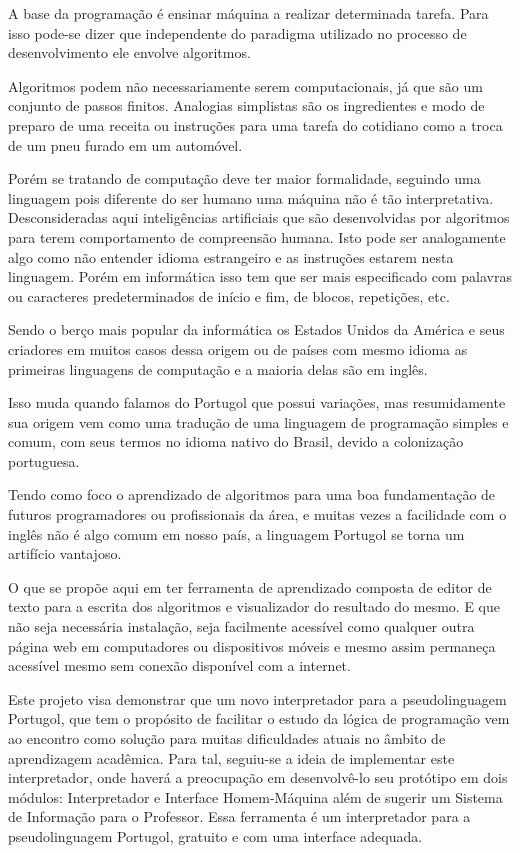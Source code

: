 
A base da programação é ensinar máquina a realizar determinada tarefa. Para isso
pode-se dizer que independente do paradigma utilizado no processo de
desenvolvimento ele envolve algoritmos.

Algoritmos podem não necessariamente serem computacionais, já que são um
conjunto de passos finitos. Analogias simplistas são os ingredientes e modo de
preparo de uma receita ou instruções para uma tarefa do cotidiano como a troca
de um pneu furado em um automóvel.

Porém se tratando de computação deve ter maior formalidade, seguindo uma linguagem
pois diferente do ser humano uma máquina não é tão interpretativa.
Desconsideradas aqui inteligências artificiais que são desenvolvidas por
algoritmos para terem  comportamento de compreensão humana. Isto pode ser
analogamente algo como não entender idioma estrangeiro e as instruções estarem
nesta linguagem. Porém em informática isso tem que ser mais especificado com
palavras ou caracteres predeterminados de início e fim, de blocos, repetições,
etc.

Sendo o berço mais popular da informática os Estados Unidos da América e seus
criadores em muitos casos dessa origem ou de países com mesmo idioma as
primeiras linguagens de computação e a maioria delas são em inglês.

Isso muda quando falamos do Portugol que possui variações, mas resumidamente
sua origem vem como uma tradução de uma linguagem de programação simples e comum,
com seus termos no idioma nativo do Brasil, devido a colonização
portuguesa.

Tendo como foco o aprendizado de algoritmos para uma boa fundamentação de
futuros programadores ou profissionais da área, e muitas vezes a facilidade com
o inglês não é algo comum em nosso país, a linguagem Portugol se torna um
artifício vantajoso.

O que se propõe aqui em ter ferramenta de aprendizado composta de editor de
texto para a escrita dos algoritmos e visualizador do resultado do mesmo.
E que não seja necessária instalação, seja facilmente acessível como qualquer
outra página web em computadores ou dispositivos móveis e mesmo assim permaneça
acessível mesmo sem conexão disponível com a internet.

Este projeto visa demonstrar que um novo interpretador para a pseudolinguagem
Portugol, que tem o propósito de facilitar o estudo da lógica de programação vem
ao encontro como solução para muitas dificuldades atuais no âmbito de
aprendizagem acadêmica. Para tal, seguiu-se a ideia de implementar este
interpretador, onde haverá a preocupação em desenvolvê-lo seu protótipo em dois
módulos: Interpretador e Interface Homem-Máquina além de sugerir um Sistema de
Informação para o Professor. Essa ferramenta é um interpretador para a
pseudolinguagem Portugol, gratuito e com uma interface adequada.
